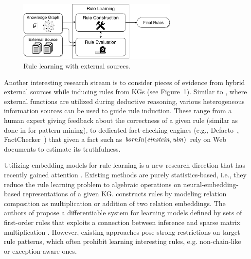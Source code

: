 \begin{figure}[t]
\centering
\includegraphics[width=8cm]{figures/discussion_overview}
\caption{Rule learning with external sources.}
\label{fig:discussion_overview}
\end{figure}


Another interesting research stream is to consider pieces of evidence from hybrid external sources while inducing rules from KGs
(see Figure~\ref{fig:discussion_overview}). Similar to \cite{DBLP:conf/rweb/EiterKRSW17}, where external functions are utilized during deductive reasoning, various heterogeneous information sources can be used to guide rule induction. These range from a human expert giving feedback about the correctness of a given rule (similar as done in \cite{Dzyuba2017} for pattern mining), to dedicated fact-checking engines (e.g., Defacto~\cite{defacto}, FactChecker~\cite{factchecker}) that given a fact such as $\mathit{bornIn(einstein,ulm)}$ rely on Web documents to estimate its truthfulness. 


 Utilizing embedding models for rule learning is a new research direction that has recently gained attention \cite{DBLP:conf/nips/YangYC17,DBLP:journals/corr/YangYHGD14a}. Existing methods are purely statistics-based, i.e., they reduce the rule learning problem to algebraic operations on neural-embedding-based representations of a given KG.  \cite{DBLP:journals/corr/YangYHGD14a} constructs rules by modeling relation composition as multiplication or addition of two relation embeddings. The authors of \cite{DBLP:conf/nips/YangYC17} propose a differentiable system for learning models defined by sets of first-order rules that exploits a connection between inference and sparse matrix multiplication \cite{DBLP:journals/corr/Cohen16b}. However, existing approaches pose strong restrictions on target rule patterns, which often prohibit learning interesting rules, e.g. non-chain-like or exception-aware ones.


